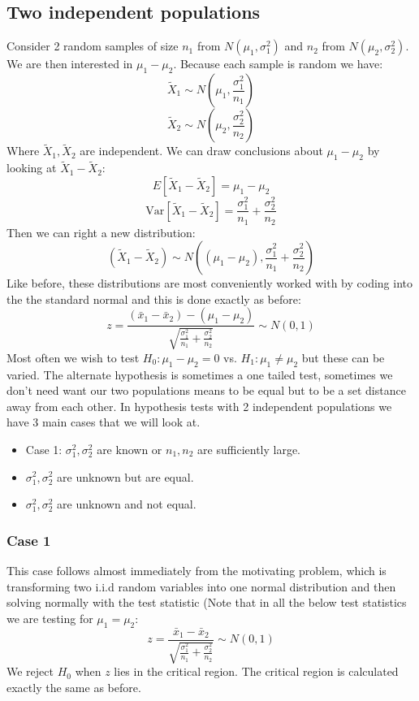 \documentclass[12pt]{article}
\newcommand{\Var}[1]{\text{Var}[#1]}
\begin{document}
\subsection*{Two independent populations}
Consider 2 random samples of size \(n_1\) from \(N(\mu_1,\sigma_1^2)\) and \(n_2\) from \(N(\mu_2,\sigma_2^2)\). We are then interested in \(\mu_1-\mu_2\). Because each sample is random we have:
\[\tilde{X}_1\sim N(\mu_1,\frac{\sigma_1^2}{n_1})\]
\[\tilde{X}_2\sim N(\mu_2,\frac{\sigma_2^2}{n_2})\]
Where  \(\tilde{X}_1,\tilde{X}_2\) are independent. We can draw conclusions about \(\mu_1-\mu_2\) by looking at \(\tilde{X}_1-\tilde{X}_2\):
\[E[\tilde{X}_1-\tilde{X}_2]=\mu_1-\mu_2\]
\[\Var{\tilde{X}_1-\tilde{X}_2}=\frac{\sigma_1^2}{n_1}+\frac{\sigma_2^2}{n_2}\]
Then we can right a new distribution:
\[(\tilde{X}_1-\tilde{X}_2)\sim N\left((\mu_1-\mu_2),\frac{\sigma^2_1}{n_1}+\frac{\sigma^2_2}{n_2}\right)\]
Like before, these distributions are most conveniently worked with by coding into the the standard normal and this is done exactly as before:
\[z=\frac{(\bar{x}_1-\bar{x}_2)-(\mu_1-\mu_2)}{\sqrt{\frac{\sigma^2_1}{n_1}+\frac{\sigma_2^2}{n_2}}}\sim N(0,1)\]
Most often we wish to test \(H_0:\mu_1-\mu_2=0\) vs. \(H_1:\mu_1\ne \mu_2\) but these can be varied. The alternate hypothesis is sometimes a one tailed test, sometimes we don't need want our two populations means to be equal but to be a set distance away from each other. In hypothesis tests with 2 independent populations we have 3 main cases that we will look at.
\begin{itemize}
    \item Case 1: \(\sigma_1^2,\sigma_2^2\) are known or \(n_1,n_2\) are sufficiently large.
    \item \(\sigma_1^2,\sigma_2^2\) are unknown but are equal.
    \item \(\sigma_1^2,\sigma_2^2\) are unknown and not equal.
\end{itemize}
\subsubsection*{Case 1}
This case follows almost immediately from the motivating problem, which is transforming two i.i.d random variables into one normal distribution and then solving normally with the test statistic (Note that in all the below test statistics we are testing for \(\mu_1=\mu_2\):
\[z=\frac{\bar{x}_1-\bar{x}_2}{\sqrt{\frac{\sigma_1^2}{n_1}+\frac{\sigma_2^2}{n_2}}}\sim N(0,1)\]
We reject \(H_0\) when \(z\) lies in the critical region. The critical region is calculated exactly the same as before.
\end{document}
